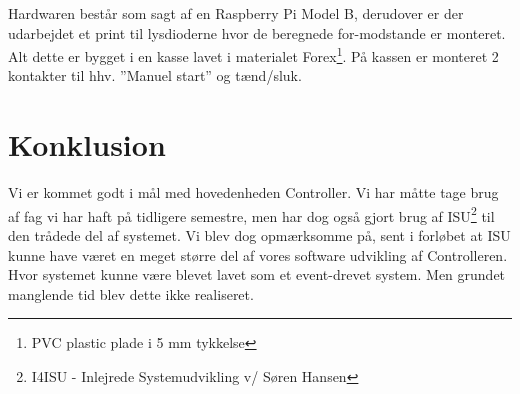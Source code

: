 Hardwaren består som sagt af en Raspberry Pi Model B, derudover er der udarbejdet et print til lysdioderne hvor de beregnede for-modstande er monteret. Alt dette er bygget i en kasse lavet i materialet Forex\footnote{PVC plastic plade i 5 mm tykkelse}. På kassen er monteret 2 kontakter til hhv. ''Manuel start'' og tænd/sluk.

\section{Konklusion}

Vi er kommet godt i mål med hovedenheden Controller. Vi har måtte tage brug af fag vi har haft på tidligere semestre, men har dog også gjort brug af ISU\footnote{I4ISU - Inlejrede Systemudvikling v/ Søren Hansen} til den trådede del af systemet. Vi blev dog opmærksomme på, sent i forløbet at ISU kunne have været en meget større del af vores software udvikling af Controlleren. Hvor systemet kunne være blevet lavet som et event-drevet system. Men grundet manglende tid blev dette ikke realiseret.